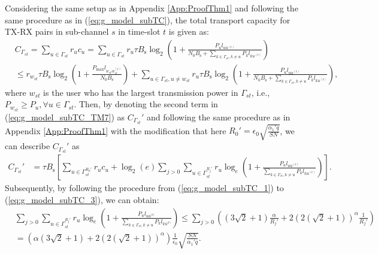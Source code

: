 \documentclass[journal,draftclsnofoot,onecolumn,12pt,twoside]{IEEEtran}
\begin{document}
\label{App:ProofThm7}

Considering the same setup as in Appendix \ref{App:ProofThm1} and following the same procedure as in (\ref{eq:g_model_subTC}), the total transport capacity for TX-RX pairs in sub-channel $s$ in time-slot $t$ is given as:
\begin{equation}
\begin{aligned}\label{eq:g_model_subTC_TM7}
&C_{\Gamma_{st}}=\sum_{u\in\Gamma_{st}}r_uc_u=\sum_{u\in\Gamma_{st}}r_u\tau B_{\text{s}}\log_2\left(1+\frac{P_ul_{uu^{(\text{r})}}}{N_0B_{\text{s}}+\sum_{k\in\Gamma_{st},k\neq u}P_kl_{ku^{(\text{r})}}}\right)\\
& \leq r_{w_{st}}\tau B_{\text{s}}\log_2\left(1+\frac{P_{\text{max}}l_{w_{st}w_{st}^{(\text{r})}}}{N_0B_{\text{s}}}\right)+\sum_{u\in\Gamma_{st},u\neq {w_{st}}}r_u\tau B_{\text{s}}\log_2\left(1+\frac{P_ul_{uu^{(\text{r})}}}{N_0B_{\text{s}}+\sum_{k\in\Gamma_{st},k\neq u}P_kl_{ku^{(\text{r})}}}\right),
\end{aligned}
\end{equation}
where $w_{st}$ is the user who has the largest transmission power in $\Gamma_{st}$, i.e., $P_{w_{st}}\geq P_u,\forall u\in\Gamma_{st}$. Then, by denoting the second term in (\ref{eq:g_model_subTC_TM7}) as $C_{\Gamma_{st}}'$ and following the same procedure as in Appendix \ref{App:ProofThm1} with the modification that here $R_0'=\epsilon_0\sqrt{\frac{\alpha_1'q}{SN}}$, we can describe $C_{\Gamma_{st}}'$ as
\begin{equation}
\begin{aligned}\label{eq:g_model_subTC_1_TM7}
C_{\Gamma_{st}}'&=\tau B_{\text{s}}\left[\sum_{u\in\Gamma^{R_0'}_{st}}r_uc_u+\log_2(e)\sum_{j>0}\sum_{u\in\Gamma_{st}^{R_j'}}r_u\log_e\left(1+\frac{P_ul_{uu^{(\text{r})}}}{\sum_{k\in\Gamma_{st},k\neq u}P_kl_{ku^{(\text{r})}}}\right)\right].
\end{aligned}
\end{equation}
Subsequently, by following the procedure from (\ref{eq:g_model_subTC_1}) to
(\ref{eq:g_model_subTC_3}), we can obtain:
\begin{equation}
\begin{aligned}\label{eq:g_model_subTC_10_TM7}
&\sum_{j>0}\sum_{u\in\Gamma_{st}^{R_j'}}r_u\log_e\left(1+\frac{P_ul_{uu^{\text{(r)}}}}{\sum_{k\in\Gamma_{st},k\neq u}P_kl_{ku^{\text{(r)}}}}\right)\leq\sum_{j>0}\left(\left(3\sqrt{2}+1\right)\frac{\alpha}{R_j'}+2(2(\sqrt{2}+1))^{\alpha}\frac{1}{R_j'}\right)\\
&=\left(\alpha\left(3\sqrt{2}+1\right)+2(2(\sqrt{2}+1))^{\alpha}\right)\frac{1}{\epsilon_0}\sqrt{\frac{SN}{\alpha_1' q}}.
\end{aligned}
\end{equation}
\end{document}
